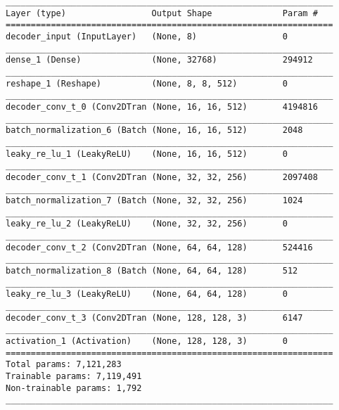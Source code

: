 \begin{lstlisting}[caption={CelebA-VAE Decoder},captionpos=b,basicstyle=\tiny, label={lst:mnist-vae-decoder}]
_________________________________________________________________
Layer (type)                 Output Shape              Param #
=================================================================
decoder_input (InputLayer)   (None, 8)                 0
_________________________________________________________________
dense_1 (Dense)              (None, 32768)             294912
_________________________________________________________________
reshape_1 (Reshape)          (None, 8, 8, 512)         0
_________________________________________________________________
decoder_conv_t_0 (Conv2DTran (None, 16, 16, 512)       4194816
_________________________________________________________________
batch_normalization_6 (Batch (None, 16, 16, 512)       2048
_________________________________________________________________
leaky_re_lu_1 (LeakyReLU)    (None, 16, 16, 512)       0
_________________________________________________________________
decoder_conv_t_1 (Conv2DTran (None, 32, 32, 256)       2097408
_________________________________________________________________
batch_normalization_7 (Batch (None, 32, 32, 256)       1024
_________________________________________________________________
leaky_re_lu_2 (LeakyReLU)    (None, 32, 32, 256)       0
_________________________________________________________________
decoder_conv_t_2 (Conv2DTran (None, 64, 64, 128)       524416
_________________________________________________________________
batch_normalization_8 (Batch (None, 64, 64, 128)       512
_________________________________________________________________
leaky_re_lu_3 (LeakyReLU)    (None, 64, 64, 128)       0
_________________________________________________________________
decoder_conv_t_3 (Conv2DTran (None, 128, 128, 3)       6147
_________________________________________________________________
activation_1 (Activation)    (None, 128, 128, 3)       0
=================================================================
Total params: 7,121,283
Trainable params: 7,119,491
Non-trainable params: 1,792
_________________________________________________________________
\end{lstlisting}